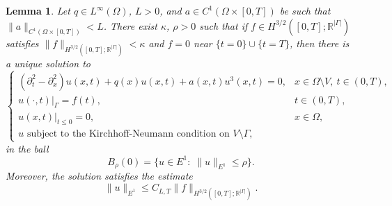 \documentclass[11pt]{amsart}
\theoremstyle{definition}
\theoremstyle{plain}
\newtheorem{lemma}[definition]{Lemma}
\numberwithin{equation}{section}
\begin{document}
\begin{lemma}\label{lemma_for_direct_problem}
    Let $q\in L^\infty(\Omega)$, $L>0$, and $a\in C^1(\Omega\times [0,T])$ be such that $\|a\|_{C^1(\Omega\times [0,T])} <L$. There exist $\kappa$, $\rho>0$ such that if $f \in H^{3/2}([0,T]; \mathbb{R}^{|\Gamma|})$ satisfies $\|f\|_{ H^{3/2}([0,T]; \mathbb{R}^{|\Gamma|})}<\kappa$ and $f = 0$ near $\{t=0\}\cup\{t=T\}$, then there is a unique solution to 
    \begin{equation}\label{non_linear_eq}
    \begin{cases}
    (\partial_{t}^2 -\partial_x^2 ) u(x,t)+q(x) u(x,t)+a(x,t)u^3(x,t)=0, &x\in \Omega\setminus V, \ t \in (0,T),\\
    u(\cdot,t)|_{\Gamma}=f(t), & t\in (0,T),\\
    u(x,t)|_{t \leq 0}=0, & x\in \Omega, \\
          u \textrm{ subject to the Kirchhoff-Neumann condition on } V\setminus\Gamma,
    \end{cases}
    \end{equation}
    in the ball
    \begin{equation*}
        B_\rho(0) = \{u \in E^1: \; \|u\|_{E^1} \leq \rho\}.
    \end{equation*}
    Moreover, the solution satisfies the estimate
    \begin{equation*}
        \|u\|_{E^1} \leq C_{L,T} \|f\|_{ H^{3/2}([0,T]; \mathbb{R}^{|\Gamma|})}.
    \end{equation*}
\end{lemma}
\end{document}
